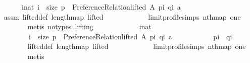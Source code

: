 \begin{isabellebody}
\ \ \ \ \ \ {\isachardoublequoteopen}{\isasymexists}i{\isacharcolon}{\kern0pt}{\isacharcolon}{\kern0pt}nat{\isachardot}{\kern0pt}\ i\ {\isacharless}{\kern0pt}\ size\ {\isacharquery}{\kern0pt}p\ {\isasymand}\ Preference{\isacharunderscore}{\kern0pt}Relation{\isachardot}{\kern0pt}lifted\ A\ {\isacharparenleft}{\kern0pt}{\isacharquery}{\kern0pt}p{\isacharbang}{\kern0pt}i{\isacharparenright}{\kern0pt}\ {\isacharparenleft}{\kern0pt}{\isacharquery}{\kern0pt}q{\isacharbang}{\kern0pt}i{\isacharparenright}{\kern0pt}\ a{\isachardoublequoteclose}\isanewline
\ \ \ \ \ \ \isamarkupfalse%
\ assm\ lifted{\isacharunderscore}{\kern0pt}def\ length{\isacharunderscore}{\kern0pt}map\ lifted\isanewline
\ \ \ \ \ \ \ \ \ \ \ \ limit{\isacharunderscore}{\kern0pt}profile{\isachardot}{\kern0pt}simps\ nth{\isacharunderscore}{\kern0pt}map\ one\isanewline
\ \ \ \ \ \ \isamarkupfalse%
\ {\isacharparenleft}{\kern0pt}metis\ {\isacharparenleft}{\kern0pt}no{\isacharunderscore}{\kern0pt}types{\isacharcomma}{\kern0pt}\ lifting{\isacharparenright}{\kern0pt}{\isacharparenright}{\kern0pt}\isanewline
\ \ \ \ \isamarkupfalse%
\ \isamarkupfalse%
\isanewline
\ \ \ \ \ \ {\isachardoublequoteopen}{\isasymforall}i{\isacharcolon}{\kern0pt}{\isacharcolon}{\kern0pt}nat{\isachardot}{\kern0pt}\isanewline
\ \ \ \ \ \ \ \ {\isacharparenleft}{\kern0pt}i\ {\isacharless}{\kern0pt}\ size\ {\isacharquery}{\kern0pt}p\ {\isasymand}\ {\isasymnot}Preference{\isacharunderscore}{\kern0pt}Relation{\isachardot}{\kern0pt}lifted\ A\ {\isacharparenleft}{\kern0pt}{\isacharquery}{\kern0pt}p{\isacharbang}{\kern0pt}i{\isacharparenright}{\kern0pt}\ {\isacharparenleft}{\kern0pt}{\isacharquery}{\kern0pt}q{\isacharbang}{\kern0pt}i{\isacharparenright}{\kern0pt}\ a{\isacharparenright}{\kern0pt}\ {\isasymlongrightarrow}\isanewline
\ \ \ \ \ \ \ \ \ \ {\isacharparenleft}{\kern0pt}{\isacharquery}{\kern0pt}p{\isacharbang}{\kern0pt}i{\isacharparenright}{\kern0pt}\ {\isacharequal}{\kern0pt}\ {\isacharparenleft}{\kern0pt}{\isacharquery}{\kern0pt}q{\isacharbang}{\kern0pt}i{\isacharparenright}{\kern0pt}{\isachardoublequoteclose}\isanewline
\ \ \ \ \ \ \isamarkupfalse%
\ lifted{\isacharunderscore}{\kern0pt}def\ length{\isacharunderscore}{\kern0pt}map\ lifted\isanewline
\ \ \ \ \ \ \ \ \ \ \ \ limit{\isacharunderscore}{\kern0pt}profile{\isachardot}{\kern0pt}simps\ nth{\isacharunderscore}{\kern0pt}map\ one\isanewline
\ \ \ \ \ \ \isamarkupfalse%
\ metis\isanewline
\ \ \ \ \isamarkupfalse%
\ \isamarkupfalse%

\end{isabellebody}
